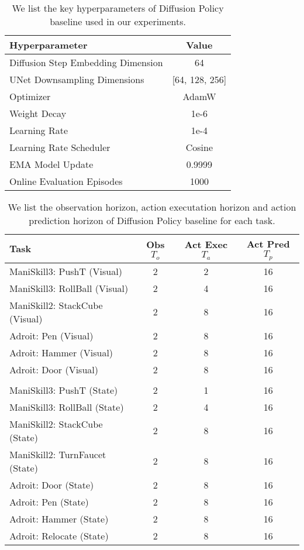 \begin{table}[!ht]
\caption{We list the key hyperparameters of Diffusion Policy baseline used in our experiments.}
\label{table:dp_training_hyperparameters}
\setlength{\tabcolsep}{3.5pt}
\begin{center}
{{
\begin{tabular}{lc}
\toprule[1pt]
\textbf{Hyperparameter}
& \textbf{Value}
\\
\midrule
Diffusion Step Embedding Dimension & 64 \\
UNet Downsampling Dimensions & [64, 128, 256] \\
Optimizer & AdamW \\
Weight Decay & 1e-6 \\
Learning Rate & 1e-4 \\ 
Learning Rate Scheduler & Cosine \\
EMA Model Update & 0.9999 \\
Online Evaluation Episodes & 1000 \\

\bottomrule[1pt]
\end{tabular}
}}
\end{center}
\vspace{-12pt}
\end{table}

\begin{table}[!ht]
\caption{We list the observation horizon, action executation horizon and action prediction horizon of Diffusion Policy baseline for each task.}
\label{table:dp_To_Ta_Tp}
\setlength{\tabcolsep}{3.5pt}
\begin{center}
{{
\begin{tabular}{l c c c}
\toprule[1pt]
\textbf{Task}
& \textbf{Obs $T_o$}
& \textbf{Act Exec $T_a$}
& \textbf{Act Pred $T_p$}
\\
\midrule
ManiSkill3: PushT (Visual) & 2 & 2 & 16 \\
ManiSkill3: RollBall (Visual) & 2 & 4 & 16 \\
ManiSkill2: StackCube (Visual) & 2 & 8 & 16 \\
Adroit: Pen (Visual) & 2 & 8 & 16 \\
Adroit: Hammer (Visual) & 2 & 8 & 16 \\
Adroit: Door (Visual) & 2 & 8 & 16 \\
& \\
ManiSkill3: PushT (State) & 2 & 1 & 16 \\
ManiSkill3: RollBall (State) & 2 & 4 & 16 \\
ManiSkill2: StackCube (State) & 2 & 8 & 16 \\
ManiSkill2: TurnFaucet (State) & 2 & 8 & 16 \\
Adroit: Door (State) & 2 & 8 & 16 \\
Adroit: Pen (State) & 2 & 8 & 16 \\
Adroit: Hammer (State) & 2 & 8 & 16 \\
Adroit: Relocate (State) & 2 & 8 & 16 \\
\bottomrule[1pt]
\end{tabular}
}}
\end{center}
\vspace{-12pt}
\end{table}

